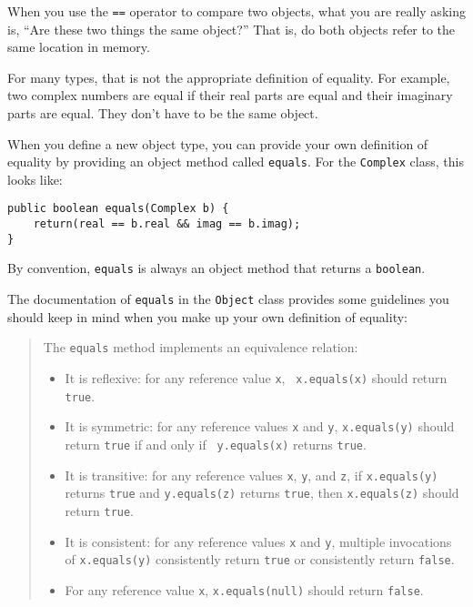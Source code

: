 \documentclass{book}
\begin{document}
When you use the {\tt ==} operator to compare two objects,
what you are really asking is, ``Are these two things the same
object?''  That is, do both objects refer to the same location
in memory.

For many types, that is not the appropriate definition of
equality.  For example, two complex numbers are equal if their
real parts are equal and their imaginary parts are equal.  They
don't have to be the same object.


When you define a new object type, you can provide your own
definition of equality by providing an object method called
{\tt equals}.  For the {\tt Complex} class, this looks like:

\begin{verbatim}
public boolean equals(Complex b) {
    return(real == b.real && imag == b.imag);
}
\end{verbatim}
%
By convention, {\tt equals} is always an object method that
returns a {\tt boolean}.

The documentation of {\tt equals} in the {\tt Object} class
provides some guidelines you should keep in mind when you
make up your own definition of equality:

\begin{quote}

The {\tt equals} method implements an equivalence relation: 


\begin{itemize}

\item It is reflexive: for any reference value {\tt x}, {\tt
x.equals(x)} should return {\tt true}.

\item It is symmetric: for any reference values {\tt x} and {\tt y},
{\tt x.equals(y)} should return {\tt true} if and only if {\tt
y.equals(x)} returns {\tt true}.

\item It is transitive: for any reference values {\tt x}, {\tt y}, and
{\tt z}, if {\tt x.equals(y)} returns {\tt true} and {\tt y.equals(z)}
returns {\tt true}, then {\tt x.equals(z)} should return {\tt true}.

\item It is consistent: for any reference values {\tt x} and {\tt y},
multiple invocations of {\tt x.equals(y)} consistently return {\tt true} or
consistently return {\tt false}.

\item For any reference value {\tt x}, {\tt x.equals(null)} should
return {\tt false}.

\end{itemize}

\end{quote}
\end{document}
